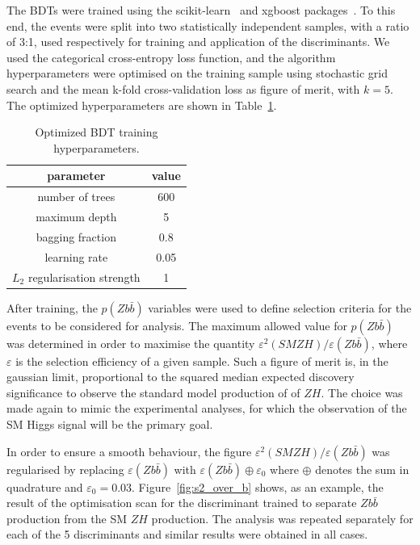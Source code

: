 The BDTs were trained using the scikit-learn~\cite{scikit-learn} and xgboost packages~\cite{xgboost}. To this end, the events were
split into two statistically independent samples, with a ratio of 3:1, used respectively for training and
application of the discriminants. %
We used the categorical cross-entropy loss function, and the algorithm hyperparameters were
optimised on the training sample using stochastic grid search and the mean
k-fold cross-validation loss as figure of merit, with $k = 5$.
The optimized hyperparameters are shown in Table~\ref{tab:bdt_hpars}.

\begin{table}
\centering
\begin{tabular}{||c|c||}
parameter & value \\
\hline
number of trees & 600 \\
maximum depth & 5 \\
bagging fraction & 0.8 \\
learning rate & 0.05 \\
$L_2$ regularisation strength & 1 \\
\end{tabular}
\caption{
\label{tab:bdt_hpars}
Optimized BDT training hyperparameters.
}
\end{table}

After training, the $p(Z b\bar{b})$ variables were used to define selection criteria
for the events to be considered for analysis. The maximum allowed value for $p(Z b\bar{b})$
was determined in order to maximise the quantity $\varepsilon^2(SM Z H) / \varepsilon(Z
b\bar{b})$, where $\varepsilon$ is the selection efficiency of a given sample. Such a
figure of merit is, in the gaussian limit, proportional to the squared median expected
discovery significance to observe the standard model production of of $Z H$.
The choice was made again to mimic the experimental analyses, for which the observation of
the SM Higgs signal will be the primary goal.

In order to ensure a smooth behaviour, the figure $\varepsilon^2(SM Z H) /
\varepsilon(Zb\bar{b})$ was regularised by replacing $\varepsilon(Zb\bar{b})$ with
$\varepsilon(Zb\bar{b}) \oplus \varepsilon_0$ where $\oplus$ denotes the sum in quadrature
and $\varepsilon_0 = 0.03$.
Figure~\ref{fig:s2_over_b} shows, as an example, the result of the optimisation scan for
the discriminant trained to separate $Z b\bar{b}$ production from the SM $Z H$
production. The analysis was repeated separately for each of the 5 discriminants and
similar results were obtained in all cases.

